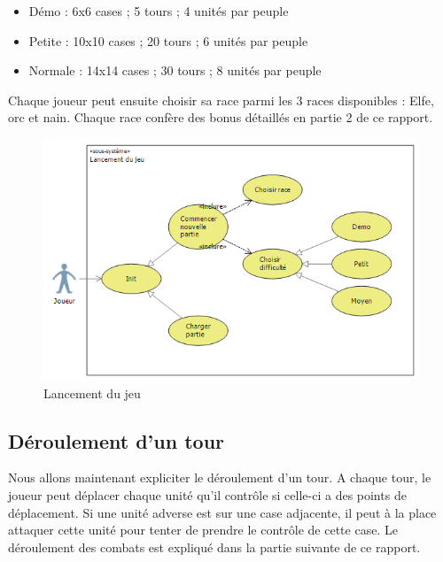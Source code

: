 \begin{itemize}
  \item Démo    :   6x6 cases ;  5 tours ; 4 unités par peuple
  \item Petite  : 10x10 cases ; 20 tours ; 6 unités par peuple
  \item Normale : 14x14 cases ; 30 tours ; 8 unités par peuple
\end{itemize}

\clearpage
Chaque joueur peut ensuite choisir sa race parmi les 3 races disponibles : Elfe, orc et nain. Chaque race confère des bonus détaillés en partie 2 de ce rapport.

\begin{figure}[!h]
\centering
\label{lancement}
\includegraphics[width=1\textwidth]{img/LancementDuJeu.png}
\caption{Lancement du jeu}
\end{figure}

\subsection{Déroulement d'un tour}

Nous allons maintenant expliciter le déroulement d'un tour. A chaque tour, le joueur peut déplacer chaque unité qu'il contrôle si celle-ci a des points de déplacement. Si une unité adverse est sur une case adjacente, il peut à la place attaquer cette unité pour tenter de prendre le contrôle de cette case. Le déroulement des combats est expliqué dans la partie suivante de ce rapport.


